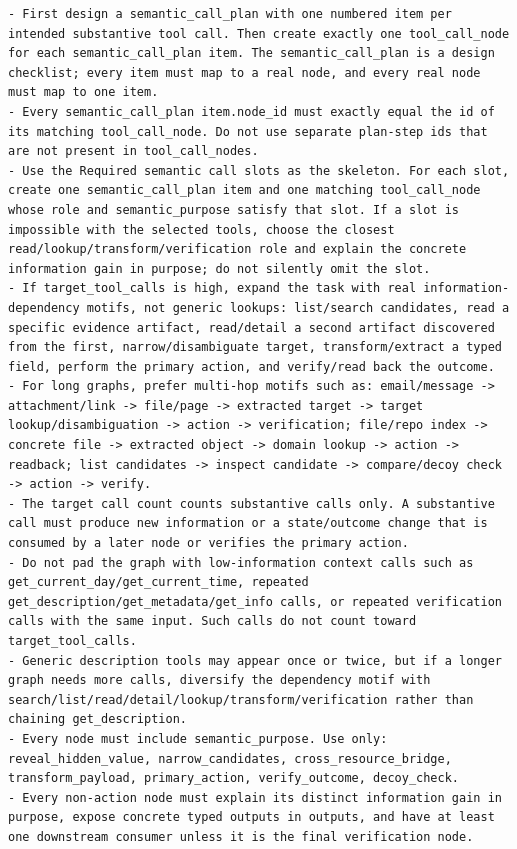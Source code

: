 \documentclass{llmxive}
\begin{document}
\begin{tcolorbox}[promptbox,title={Dependency Graph Planner Prompt}]
\begin{Verbatim}[breaklines=true, breakanywhere=true, fontsize=\scriptsize, breaksymbolleft={}]
- First design a semantic_call_plan with one numbered item per intended substantive tool call. Then create exactly one tool_call_node for each semantic_call_plan item. The semantic_call_plan is a design checklist; every item must map to a real node, and every real node must map to one item.
- Every semantic_call_plan item.node_id must exactly equal the id of its matching tool_call_node. Do not use separate plan-step ids that are not present in tool_call_nodes.
- Use the Required semantic call slots as the skeleton. For each slot, create one semantic_call_plan item and one matching tool_call_node whose role and semantic_purpose satisfy that slot. If a slot is impossible with the selected tools, choose the closest read/lookup/transform/verification role and explain the concrete information gain in purpose; do not silently omit the slot.
- If target_tool_calls is high, expand the task with real information-dependency motifs, not generic lookups: list/search candidates, read a specific evidence artifact, read/detail a second artifact discovered from the first, narrow/disambiguate target, transform/extract a typed field, perform the primary action, and verify/read back the outcome.
- For long graphs, prefer multi-hop motifs such as: email/message -> attachment/link -> file/page -> extracted target -> target lookup/disambiguation -> action -> verification; file/repo index -> concrete file -> extracted object -> domain lookup -> action -> readback; list candidates -> inspect candidate -> compare/decoy check -> action -> verify.
- The target call count counts substantive calls only. A substantive call must produce new information or a state/outcome change that is consumed by a later node or verifies the primary action.
- Do not pad the graph with low-information context calls such as get_current_day/get_current_time, repeated get_description/get_metadata/get_info calls, or repeated verification calls with the same input. Such calls do not count toward target_tool_calls.
- Generic description tools may appear once or twice, but if a longer graph needs more calls, diversify the dependency motif with search/list/read/detail/lookup/transform/verification rather than chaining get_description.
- Every node must include semantic_purpose. Use only: reveal_hidden_value, narrow_candidates, cross_resource_bridge, transform_payload, primary_action, verify_outcome, decoy_check.
- Every non-action node must explain its distinct information gain in purpose, expose concrete typed outputs in outputs, and have at least one downstream consumer unless it is the final verification node.

\end{Verbatim}
\end{tcolorbox}
\end{document}
